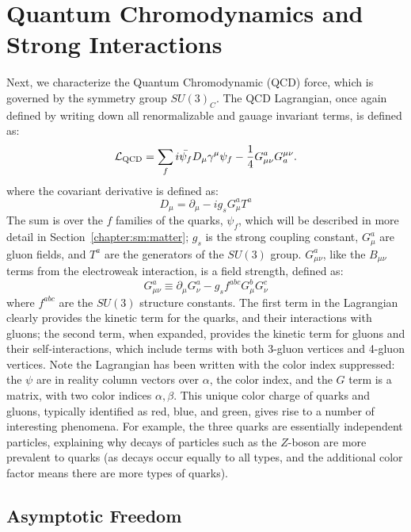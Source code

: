 \section{Quantum Chromodynamics and Strong Interactions}

Next, we characterize the Quantum Chromodynamic (QCD) force, which is governed by the symmetry group $SU(3)_C$. The QCD Lagrangian, once again defined by writing down all renormalizable and gauage invariant terms, is defined as:
%
\begin{equation}
\mathcal{L}_{\mathrm{QCD}} = \sum_f i \bar{\psi_f} D_\mu \gamma^\mu \psi_f - \frac{1}{4} G_{\mu\nu}^a G_{a}^{\mu\nu}.
\end{equation}
%
where the covariant derivative is defined as:
%
\begin{equation}
D_\mu = \partial_\mu - i g_s G_\mu^a T^a
\end{equation}
%
The sum is over the $f$ families of the quarks, $\psi_f$, which will be described in more detail in Section~\ref{chapter:sm:matter}; $g_s$ is the strong coupling constant, $G_\mu^a$ are gluon fields, and $T^a$ are the generators of the $SU(3)$ group. $G_{\mu\nu}^a$, like the $B_{\mu\nu}$ terms from the electroweak interaction, is a field strength, defined as:
%
\begin{equation}
G_{\mu\nu}^a \equiv \partial_\mu G_\nu^a - g_s f^{abc}G_\mu^b G_\nu^c
\end{equation}
%
where $f^{abc}$ are the $SU(3)$ structure constants. The first term in the Lagrangian clearly provides the kinetic term for the quarks, and their interactions with gluons; the second term, when expanded, provides the kinetic term for gluons and their self-interactions, which include terms with both 3-gluon vertices and 4-gluon vertices. Note the Lagrangian has been written with the color index suppressed: the $\psi$ are in reality column vectors over $\alpha$, the color index, and the $G$ term is a matrix, with two color indices $\alpha, \beta$. This unique color charge of quarks and gluons, typically identified as red, blue, and green, gives rise to a number of interesting phenomena. For example, the three quarks are essentially independent particles, explaining why decays of particles such as the $Z$-boson are more prevalent to quarks (as decays occur equally to all types, and the additional color factor means there are more types of quarks).

\subsection{Asymptotic Freedom}

